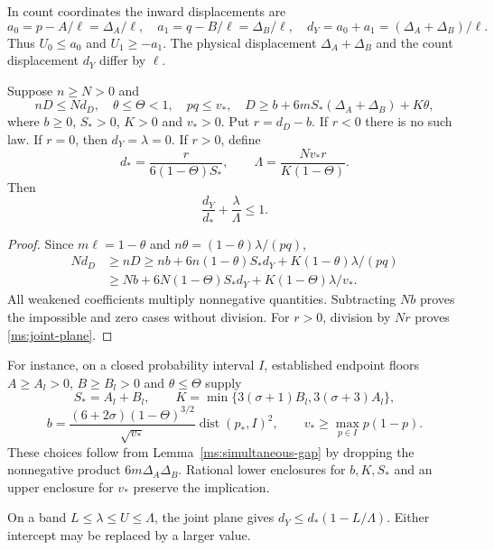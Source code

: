In count coordinates the inward displacements are
\[
 a_0=p-A/\ell=\Delta_A/\ell,\quad
 a_1=q-B/\ell=\Delta_B/\ell,
 \quad d_Y=a_0+a_1=(\Delta_A+\Delta_B)/\ell.
\]
Thus $U_0\le a_0$ and $U_1\ge-a_1$. The physical displacement
$\Delta_A+\Delta_B$ and the count displacement $d_Y$ differ by $\ell$.

\begin{theorem}
\label{ms:joint-resource}\label{ms:fourier:rescore:joint-resource}
Suppose $n\ge N>0$ and
\[
 nD\le Nd_D,\quad \theta\le\Theta<1,\quad pq\le v_*,\quad
 D\ge b+6mS_*(\Delta_A+\Delta_B)+K\theta,
\]
where $b\ge0$, $S_*>0$, $K>0$ and $v_*>0$. Put $r=d_D-b$.
If $r<0$ there is no such law. If $r=0$, then $d_Y=\lambda=0$.
If $r>0$, define
\[
 d_* =\frac{r}{6(1-\Theta)S_*},\qquad
 \Lambda=\frac{Nv_*r}{K(1-\Theta)}.
\]
Then
\begin{equation}
 \frac{d_Y}{d_*}+\frac\lambda\Lambda\le1.
\label{ms:joint-plane}
\end{equation}
\end{theorem}
\begin{proof}
Since $m\ell=1-\theta$ and
$n\theta=(1-\theta)\lambda/(pq)$,
\begin{align*}
 Nd_D&\ge nD\ge nb+6n(1-\theta)S_*d_Y
                          +K(1-\theta)\lambda/(pq)\\
 &\ge Nb+6N(1-\Theta)S_*d_Y+K(1-\Theta)\lambda/v_*.
\end{align*}
All weakened coefficients multiply nonnegative quantities. Subtracting
$Nb$ proves the impossible and zero cases without division. For $r>0$,
division by $Nr$ proves \eqref{ms:joint-plane}.
\end{proof}

For instance, on a closed probability interval $I$, established endpoint
floors $A\ge A_l>0$, $B\ge B_l>0$ and $\theta\le\Theta$ supply
\[
 S_*=A_l+B_l,\qquad K=\min\{3(\sigma+1)B_l,3(\sigma+3)A_l\},
\]
\[
 b=\frac{(6+2\sigma)(1-\Theta)^{3/2}}{\sqrt{v_*}}
          \operatorname{dist}(p_*,I)^2,
 \qquad v_*\ge\max_{p\in I}p(1-p).
\]
These choices follow from Lemma~\ref{ms:simultaneous-gap} by dropping the
nonnegative product $6m\Delta_A\Delta_B$. Rational lower enclosures for
$b,K,S_*$ and an upper enclosure for $v_*$ preserve the implication.

On a band $L\le\lambda\le U\le\Lambda$, the joint plane gives
$d_Y\le d_*(1-L/\Lambda)$. Either intercept may be replaced by a larger value.
